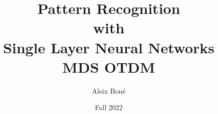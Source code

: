 


\usepackage{tikz}
\usepackage{pgfplots}
\pgfplotsset{compat=1.18}

\tikzexternalize %

\usepackage[separate-uncertainty]{siunitx}

\usepackage{fancyvrb}
\usepackage{tabularray}



\makeatletter
\g@addto@macro\@floatboxreset\centering
\makeatother




\renewcommand\and{\\[\baselineskip]}

\title{\Huge Pattern Recognition \\ with \\ Single Layer Neural Networks\\[1em]
\Large \hphantom{M}MDS \textendash{} OTDM}
\author{Aleix Boné}
\date{Fall 2022}

\usepackage{printlen}



